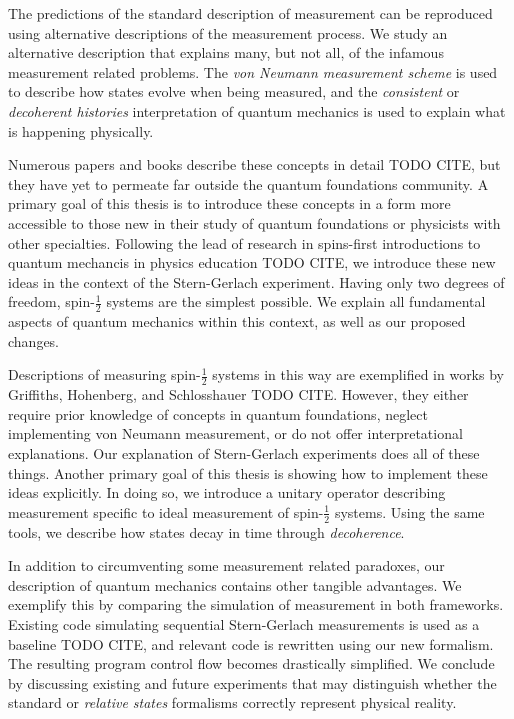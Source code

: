 The predictions of the standard description of measurement can be reproduced using alternative
descriptions of the measurement process. We study an alternative description that explains many, but not all,  of the infamous measurement related problems. The \textit{von Neumann measurement scheme} is used to describe how states evolve when being measured, and the \textit{consistent} or \textit{decoherent histories} interpretation of quantum mechanics is used to explain what is happening physically.

Numerous papers and books describe these concepts in detail TODO CITE, but they have yet to permeate
far outside the quantum foundations community. A primary goal of this thesis is to introduce
these concepts in a form more accessible to those new in their study of quantum foundations or physicists with other specialties. Following the lead of research in spins-first introductions to quantum mechancis in physics education TODO CITE, we introduce these new ideas in the context of the Stern-Gerlach experiment. Having only two degrees of freedom, spin-$\frac{1}{2}$ systems are the simplest possible. We explain all fundamental aspects of quantum mechanics within this context, as well as our proposed changes.

Descriptions of measuring spin-$\frac{1}{2}$ systems in this way are exemplified
in works by Griffiths, Hohenberg, and Schlosshauer TODO CITE. However, they either require prior knowledge
of concepts in quantum foundations, neglect implementing von Neumann measurement, or do not offer interpretational explanations. Our explanation of Stern-Gerlach experiments does all of these things. Another primary goal of this thesis is showing how to implement these ideas explicitly. In doing so, we introduce a  unitary operator describing measurement specific to ideal measurement of spin-$\frac{1}{2}$ systems. Using the same tools, we describe how states decay in time through \textit{decoherence}.

In addition to circumventing some measurement related paradoxes, our description of quantum
mechanics contains other tangible advantages. We exemplify this by comparing the simulation of measurement in  both frameworks. Existing code simulating sequential Stern-Gerlach measurements is used as a baseline TODO CITE, and relevant code is rewritten using our new formalism. The resulting program control flow becomes drastically simplified. We conclude by discussing existing and future experiments that may distinguish whether the standard or \textit{relative states} formalisms correctly represent physical reality.
%
%

